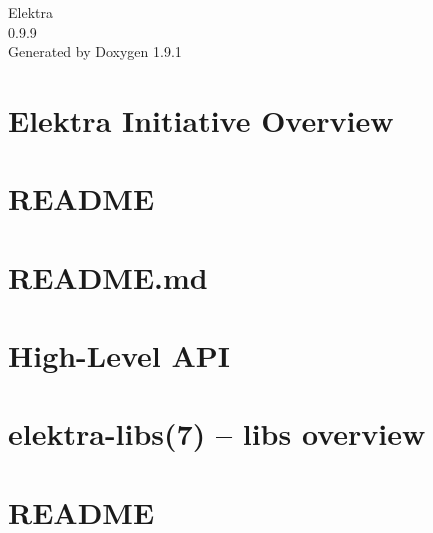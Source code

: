 \let\mypdfximage\pdfximage\def\pdfximage{\immediate\mypdfximage}\documentclass[twoside]{book}
\newcommand{\+}{\discretionary{\mbox{\scriptsize$\hookleftarrow$}}{}{}}
\newcommand{\clearemptydoublepage}{%
  \newpage{\pagestyle{empty}\cleardoublepage}%
}
\begin{document}
\raggedbottom

\hypersetup{pageanchor=false,
             bookmarksnumbered=true,
             pdfencoding=unicode
            }
\begin{titlepage}
\vspace*{7cm}
\begin{center}%
{\Large Elektra \\[1ex]\large 0.\+9.\+9 }\\
\vspace*{1cm}
{\large Generated by Doxygen 1.9.1}\\
\end{center}
\end{titlepage}
\clearemptydoublepage
{}
\tableofcontents
\clearemptydoublepage
{}
\hypersetup{pageanchor=true}

\chapter{Elektra Initiative Overview}
\label{index}\hypertarget{index}{}
\chapter{README}
\label{md_src_libs_elektra_README}

\chapter{README.\+md}
\label{src_libs_getenv_README_md}

\chapter{High-\/\+Level API}
\label{src_libs_highlevel_README_md}

\chapter{elektra-\/libs(7) -- libs overview}
\label{src_libs_README_md}

\chapter{README}
\label{md_src_bindings_io_doc_README}

\end{document}
